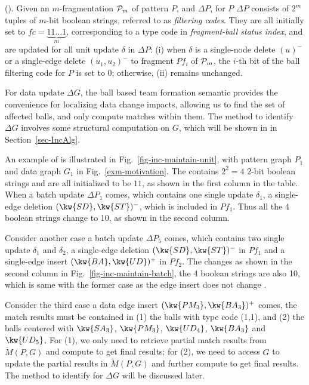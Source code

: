  (\ballfilter).
Given an $m$-fragmentation ${\cal P}_{m}$ of pattern $P$, and $\Delta P$, \ballfilter for $P$ \wrt $\Delta P$ consists of $2^{m}$ tuples of $m$-bit boolean strings, referred to as {\em filtering codes}. They are all initially set to $fc=\underbrace{11\ldots 1}_{m}$, corresponding to a type code in {\em fragment-ball status index}, and are updated for all unit update $\delta$ in $\Delta P$:
(i) when $\delta$ is a single-node delete $(u)^{-}$ or a single-edge delete $(u_{1}, u_{2})^{-}$ to fragment ${Pf}_{i}$ of ${\cal P}_{m}$, the $i$-th bit of the ball filtering code for $P$ is set to 0; otherwise, (ii) \ballfilter remains unchanged.

For data update $\Delta G$, the ball based team formation semantic provides the convenience for localizing data change impacts, allowing us to find the set of affected balls, and only compute matches within them. The method to identify \affballsx \wrt $\Delta G$ involves some structural computation on $G$, which will be shown in in Section~\ref{sec-IncAlg}.

\begin{example}
\label{exa-ball-filtering-code}
An example of \ballfilter is illustrated in Fig.~\ref{fig-inc-maintain-unit}, with pattern graph $P_1$ and data graph $G_1$ in Fig.~\ref{exm-motivation}. The \ballfilter contains $2^{2}=4$ $2$-bit boolean strings and are all initialized to be $11$, as shown in the first column in the \ballfilter table. When a batch update $\Delta P_1$ comes, which contains one single update $\delta_1$, a single-edge deletion $(\kw{SD},\kw{ST})^-$, which is included in $Pf_{1}$. Thus all the 4 boolean strings change to 10, as shown in the second column.

Consider another case a batch update $\Delta P_5$ comes, which contains two single update $\delta_1$ and $\delta_2$, a single-edge deletion $(\kw{SD},\kw{ST})^-$ in $Pf_{1}$ and a single-edge insert $(\kw{BA},\kw{UD})^+$ in $Pf_{2}$. The \ballfilter changes as shown in the second column in Fig.~\ref{fig-inc-maintain-batch}, the 4 boolean strings are also 10, which is same with the former case as the edge insert does not change \ballfilter.

Consider the third case a data edge insert $(\kw{PM_3},\kw{BA_3})^+$ comes, the match results must be contained in (1) the balls with type code (1,1), and (2) the balls centered with $\kw{SA_3}$, $\kw{PM_3}$, $\kw{UD_4}$, $\kw{BA_3}$ and $\kw{UD_5}$. For (1), we only need to retrieve partial match results from $\tilde{M}(P,G)$ and compute to get final results; for (2), we need to access $G$ to update the partial results in $\tilde{M}(P,G)$ and further compute to get final results. The method to identify \affballsx for $\Delta G$ will be discussed later.
\end{example}



